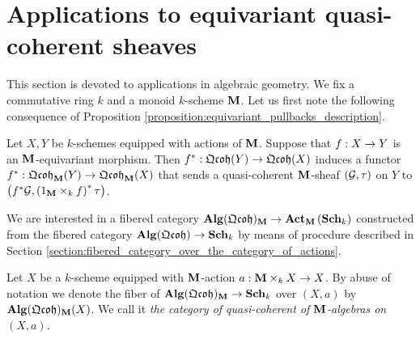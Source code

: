 \section{Applications to equivariant quasi-coherent sheaves}
\noindent
This section is devoted to applications in algebraic geometry. We fix a commutative ring $k$ and a monoid $k$-scheme $\mathbf{M}$. Let us first note the following consequence of Proposition \ref{proposition:equivariant_pullbacks_description}.

\begin{corollary}\label{corollary:pullbacks_of_equivariant_sheaves}
Let $X,Y$ be $k$-schemes equipped with actions of $\mathbf{M}$. Suppose that $f:X\rightarrow Y$ is an $\mathbf{M}$-equivariant morphism. Then $f^*:\mathfrak{Qcoh}(Y)\rightarrow \mathfrak{Qcoh}(X)$ induces a functor $f^*:\mathfrak{Qcoh}_{\mathbf{M}}(Y)\rightarrow \mathfrak{Qcoh}_{\mathbf{M}}(X)$ that sends a quasi-coherent $\mathbf{M}$-sheaf $({\mathcal G},\tau)$ on $Y$ to $\big(f^*{\mathcal G},\left(1_{\mathbf{M}}\times_k f\right)^*\tau\big)$.
\end{corollary}
\noindent
We are interested in a fibered category $\mathbf{Alg}(\mathfrak{Qcoh})_{\mathbf{M}}\rightarrow \mathbf{Act}_{\mathbf{M}}\left(\mathbf{Sch}_k\right)$ constructed from the fibered category $\mathbf{Alg}(\mathfrak{Qcoh})\rightarrow \mathbf{Sch}_k$ by means of procedure described in Section \ref{section:fibered_category_over_the_category_of_actions}. 

\begin{definition}
Let $X$ be a $k$-scheme equipped with $\mathbf{M}$-action $a:\mathbf{M}\times_kX\rightarrow X$. By abuse of notation we denote the fiber of $\mathbf{Alg}(\mathfrak{Qcoh})_{\mathbf{M}}\rightarrow \mathbf{Sch}_k$ over $(X,a)$ by $\mathbf{Alg}(\mathfrak{Qcoh})_{\mathbf{M}}(X)$. We call it \textit{the category of quasi-coherent of $\mathbf{M}$-algebras on $(X,a)$}.
\end{definition}

